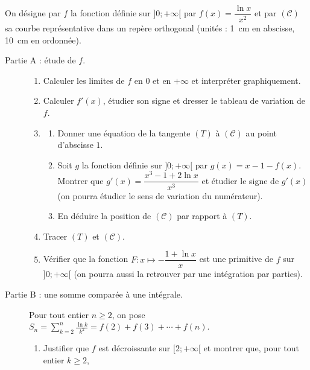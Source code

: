 \begin{exo}
\label{exo:pb somme ln k}
      On d\'esigne par $f$ la fonction d\'efinie sur $]0 ; +\infty[$ par $f(x) = \dfrac{\ln x}{x^2}$
      et par $(\mathscr{C})$ sa courbe repr\'esentative dans un rep\`ere orthogonal (unit\'es : 1~cm en abscisse, 10~cm en ordonn\'ee).
      \begin{description}
            \item[Partie A : \'etude de $f$.]
                  \begin{enumerate}
                        \item Calculer les limites de $f$ en $0$ et en $+\infty$ et interpr\'eter graphiquement.
                        \item Calculer $f'(x)$, \'etudier son signe et dresser le tableau de variation de $f$.
                        \item \begin{enumerate}
                                    \item Donner une \'equation de la tangente $(T)$ \`a $(\mathscr{C})$ au point d'abscisse $1$.
                                    \item Soit $g$ la fonction d\'efinie sur $]0 ; +\infty[$ par $g(x) = x - 1 - f(x)$.
                                          Montrer que $g'(x) = \dfrac{x^3 - 1 + 2\ln x}{x^3}$ et \'etudier le signe de $g'(x)$
                                          (on pourra \'etudier le sens de variation du num\'erateur).
                                    \item En d\'eduire la position de $(\mathscr{C})$ par rapport \`a $(T)$.
                              \end{enumerate}
                        \item Tracer $(T)$ et $(\mathscr{C})$.
                        \item V\'erifier que la fonction $F : x \mapsto -\dfrac{1 + \ln x}{x}$ est une primitive de $f$ sur
                              $]0 ; +\infty[$ (on pourra aussi la retrouver par une int\'egration par parties).
                  \end{enumerate}
            \item[Partie B : une somme compar\'ee \`a une int\'egrale.]
                  Pour tout entier $n \geq 2$, on pose
                  $\displaystyle S_n = \sum_{k=2}^{n} \frac{\ln k}{k^2} = f(2) + f(3) + \cdots + f(n)$.
                  \begin{enumerate}
                        \item Justifier que $f$ est d\'ecroissante sur $[2 ; +\infty[$ et montrer que, pour tout entier $k \geq 2$,

\end{enumerate}
\end{description}
\end{exo}
